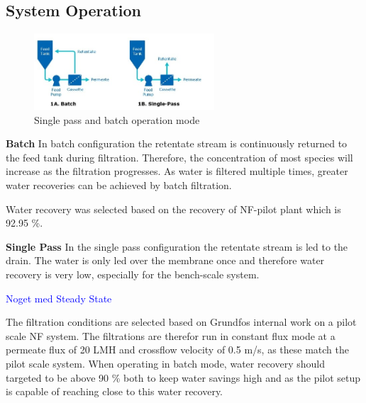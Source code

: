 \subsection{System Operation}
\begin{figure}[H]
    \centering
    \includegraphics[width=0.6\textwidth]{Billeder/exp/batch_vs_single_pass.png}
    \caption{Single pass and batch operation mode}
    \label{fig:batch_vs_single_pass_system_operation_mode}
\end{figure}



\textbf{Batch}
In batch configuration the retentate stream is continuously returned to the feed tank during filtration.
Therefore, the concentration of most species will increase as the filtration progresses.
As water is filtered multiple times, greater water recoveries can be achieved by batch filtration.


Water recovery was selected based on the recovery of NF-pilot plant which is 92.95 \%.



\textbf{Single Pass}
In the single pass configuration the retentate stream is led to the drain.
The water is only led over the membrane once and therefore water recovery is very low, especially for the bench-scale system.

\textcolor{blue}{Noget med Steady State}


The filtration conditions are selected based on Grundfos internal work on a pilot scale NF system.
The filtrations are therefor run in constant flux mode at a  permeate flux of 20 LMH and crossflow velocity of 0.5 m/s, as these match the pilot scale system. 
When operating in batch mode, water recovery should targeted to be above 90 \% both to keep water savings  high and as the pilot setup is capable of reaching close to this water recovery. 


